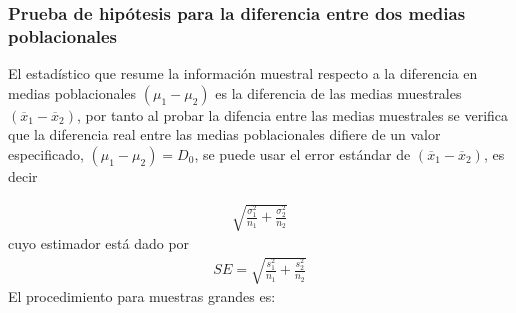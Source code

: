 \documentclass[a4paper]{report} %
\begin{document}
\subsubsection{Prueba de hip\'otesis para la diferencia entre dos medias poblacionales}

El estad\'istico que resume la informaci\'on muestral respecto a la diferencia en medias poblacionales $\left(\mu_{1}-\mu_{2}\right)$ es la diferencia de las medias muestrales $\left(\overline{x}_{1}-\overline{x}_{2}\right)$, por tanto al probar la difencia entre las medias muestrales se verifica que la diferencia real entre las medias poblacionales difiere de un valor especificado, $\left(\mu_{1}-\mu_{2}\right)=D_{0}$, se puede usar el error est\'andar de $\left(\overline{x}_{1}-\overline{x}_{2}\right)$, es decir

\begin{eqnarray}\sqrt{\frac{\sigma^{2}_{1}}{n_{1}}+\frac{\sigma^{2}_{2}}{n_{2}}}\end{eqnarray}
cuyo estimador est\'a dado por
\begin{eqnarray}SE=\sqrt{\frac{s^{2}_{1}}{n_{1}}+\frac{s^{2}_{2}}{n_{2}}}\end{eqnarray}
El procedimiento para muestras grandes es:
\end{document}
